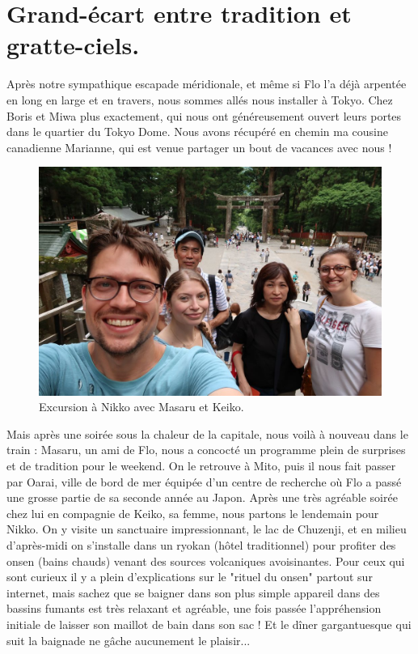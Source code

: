 \hypertarget{grand-uxe9cart-entre-tradition-et-gratte-ciels.}{%
\section{Grand-écart entre tradition et
gratte-ciels.}\label{grand-uxe9cart-entre-tradition-et-gratte-ciels.}}

Après notre sympathique escapade méridionale, et même si Flo l'a déjà
arpentée en long en large et en travers, nous sommes allés nous
installer à Tokyo. Chez Boris et Miwa plus exactement, qui nous ont
généreusement ouvert leurs portes dans le quartier du Tokyo Dome. Nous
avons récupéré en chemin ma cousine canadienne Marianne, qui est venue
partager un bout de vacances avec nous !

\begin{figure}
\centering
\includegraphics{images/20180710_nikko.JPG}
\caption{Excursion à Nikko avec Masaru et Keiko.}
\end{figure}

Mais après une soirée sous la chaleur de la capitale, nous voilà à
nouveau dans le train : Masaru, un ami de Flo, nous a concocté un
programme plein de surprises et de tradition pour le weekend. On le
retrouve à Mito, puis il nous fait passer par Oarai, ville de bord de
mer équipée d'un centre de recherche où Flo a passé une grosse partie de
sa seconde année au Japon. Après une très agréable soirée chez lui en
compagnie de Keiko, sa femme, nous partons le lendemain pour Nikko. On y
visite un sanctuaire impressionnant, le lac de Chuzenji, et en milieu
d'après-midi on s'installe dans un ryokan (hôtel traditionnel) pour
profiter des onsen (bains chauds) venant des sources volcaniques
avoisinantes. Pour ceux qui sont curieux il y a plein d'explications sur
le "rituel du onsen" partout sur internet, mais sachez que se baigner
dans son plus simple appareil dans des bassins fumants est très relaxant
et agréable, une fois passée l'appréhension initiale de laisser son
maillot de bain dans son sac ! Et le dîner gargantuesque qui suit la
baignade ne gâche aucunement le plaisir...

